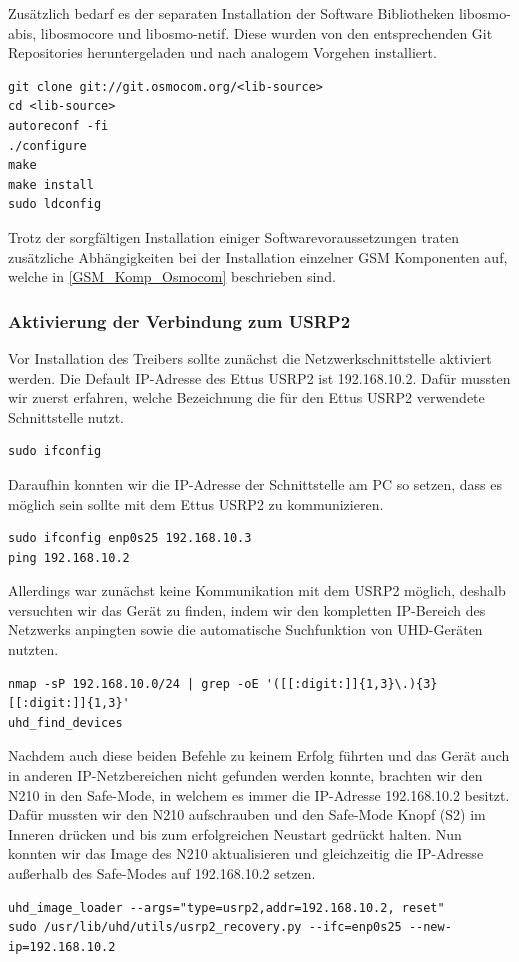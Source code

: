 Zusätzlich bedarf es der separaten Installation der Software Bibliotheken libosmo-abis, libosmocore und libosmo-netif. Diese wurden von den entsprechenden Git Repositories heruntergeladen und nach analogem Vorgehen installiert.

\begin{lstlisting}
git clone git://git.osmocom.org/<lib-source>
cd <lib-source>
autoreconf -fi
./configure
make
make install
sudo ldconfig
\end{lstlisting}

Trotz der sorgfältigen Installation einiger Softwarevoraussetzungen traten zusätzliche Abhängigkeiten bei der Installation einzelner GSM Komponenten auf, welche in \ref{GSM_Komp_Osmocom} beschrieben sind.

\subsubsection{Aktivierung der Verbindung zum USRP2}\label{usrp2_connect}
Vor Installation des Treibers sollte zunächst die Netzwerkschnittstelle aktiviert werden. Die Default IP-Adresse des Ettus USRP2 ist 192.168.10.2. Dafür mussten wir zuerst erfahren, welche Bezeichnung die für den Ettus USRP2 verwendete Schnittstelle nutzt.
\begin{lstlisting}
sudo ifconfig
\end{lstlisting}

Daraufhin konnten wir die IP-Adresse der Schnittstelle am PC so setzen, dass es möglich sein sollte mit dem Ettus USRP2 zu kommunizieren.
\begin{lstlisting}
sudo ifconfig enp0s25 192.168.10.3
ping 192.168.10.2
\end{lstlisting}

Allerdings war zunächst keine Kommunikation mit dem USRP2 möglich, deshalb versuchten wir das Gerät zu finden, indem wir den kompletten IP-Bereich des Netzwerks anpingten sowie die automatische Suchfunktion von UHD-Geräten nutzten.
\begin{lstlisting}
nmap -sP 192.168.10.0/24 | grep -oE '([[:digit:]]{1,3}\.){3}[[:digit:]]{1,3}'
uhd_find_devices
\end{lstlisting}

Nachdem auch diese beiden Befehle zu keinem Erfolg führten und das Gerät auch in anderen IP-Netzbereichen nicht gefunden werden konnte, brachten wir den N210 in den Safe-Mode, in welchem es immer die IP-Adresse 192.168.10.2 besitzt. Dafür mussten wir den N210 aufschrauben und den Safe-Mode Knopf (S2) im Inneren drücken und bis zum erfolgreichen Neustart gedrückt halten. Nun konnten wir das Image des N210 aktualisieren und gleichzeitig die IP-Adresse außerhalb des Safe-Modes auf 192.168.10.2 setzen.
\begin{lstlisting}
uhd_image_loader --args="type=usrp2,addr=192.168.10.2, reset"
sudo /usr/lib/uhd/utils/usrp2_recovery.py --ifc=enp0s25 --new-ip=192.168.10.2
\end{lstlisting}

